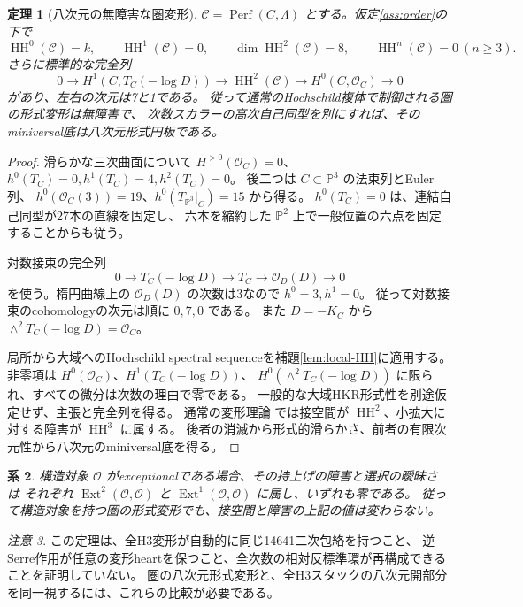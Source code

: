 \documentclass[11pt,a4paper]{ltjsarticle}
\newtheorem{theorem}{定理}[section]
\newtheorem{corollary}[theorem]{系}
\theoremstyle{definition}\newtheorem{definition}[theorem]{定義}
\theoremstyle{remark}\newtheorem{remark}[theorem]{注意}
\newcommand{\HH}{\operatorname{HH}}
\newcommand{\Perf}{\operatorname{Perf}}
\newcommand{\Ext}{\operatorname{Ext}}
\newcommand{\OO}{\mathcal O}
\newcommand{\PP}{\mathbb P}
\begin{document}
\begin{theorem}[八次元の無障害な圏変形]\label{thm:HH8}
$\mathcal C=\Perf(C,\Lambda)$ とする。仮定\ref{ass:order}の下で
\[
\HH^0(\mathcal C)=k,\qquad \HH^1(\mathcal C)=0,\qquad
\dim\HH^2(\mathcal C)=8,\qquad \HH^n(\mathcal C)=0\ (n\ge3).
\]
さらに標準的な完全列
\[
0\longrightarrow H^1(C,T_C(-\log D))\longrightarrow\HH^2(\mathcal C)
\longrightarrow H^0(C,\OO_C)\longrightarrow0
\]
があり、左右の次元は7と1である。
従って通常のHochschild複体で制御される圏の形式変形は無障害で、
次数スカラーの高次自己同型を別にすれば、そのminiversal底は八次元形式円板である。
\end{theorem}
\begin{proof}
滑らかな三次曲面について $H^{>0}(\OO_C)=0$、
$h^0(T_C)=0,h^1(T_C)=4,h^2(T_C)=0$。
後二つは $C\subset\PP^3$ の法束列とEuler列、
$h^0(\OO_C(3))=19$、$h^0(T_{\PP^3}|_C)=15$ から得る。
$h^0(T_C)=0$ は、連結自己同型が27本の直線を固定し、
六本を縮約した $\PP^2$ 上で一般位置の六点を固定することからも従う。

対数接束の完全列
\[
0\longrightarrow T_C(-\log D)\longrightarrow T_C
\longrightarrow\OO_D(D)\longrightarrow0
\]
を使う。楕円曲線上の $\OO_D(D)$ の次数は3なので $h^0=3,h^1=0$。
従って対数接束のcohomologyの次元は順に $0,7,0$ である。
また $D=-K_C$ から $\wedge^2T_C(-\log D)=\OO_C$。

局所から大域へのHochschild spectral sequenceを補題\ref{lem:local-HH}に適用する。
非零項は $H^0(\OO_C)$、$H^1(T_C(-\log D))$、
$H^0(\wedge^2T_C(-\log D))$ に限られ、すべての微分は次数の理由で零である。
一般的な大域HKR形式性を別途仮定せず、主張と完全列を得る。
通常の変形理論 \cite{LVdB} では接空間が $\HH^2$、小拡大に対する障害が $\HH^3$ に属する。
後者の消滅から形式的滑らかさ、前者の有限次元性から八次元のminiversal底を得る。
\end{proof}

\begin{corollary}
構造対象 $\OO$ がexceptionalである場合、その持上げの障害と選択の曖昧さ \cite{LowenObject} は
それぞれ $\Ext^2(\OO,\OO)$ と $\Ext^1(\OO,\OO)$ に属し、いずれも零である。
従って構造対象を持つ圏の形式変形でも、接空間と障害の上記の値は変わらない。
\end{corollary}

\begin{remark}
この定理は、全H3変形が自動的に同じ14641二次包絡を持つこと、
逆Serre作用が任意の変形heartを保つこと、全次数の相対反標準環が再構成できることを証明していない。
圏の八次元形式変形と、全H3スタックの八次元開部分を同一視するには、これらの比較が必要である。
\end{remark}
\end{document}
